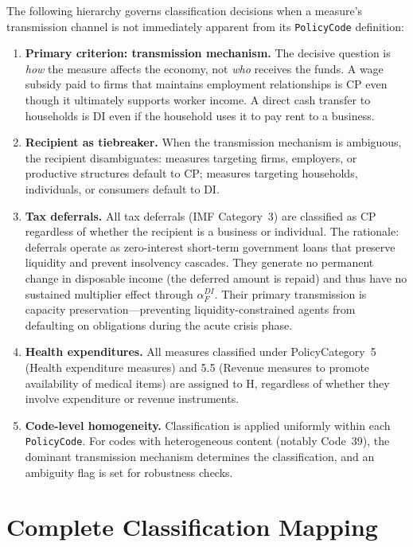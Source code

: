 \documentclass[12pt,a4paper]{article}
\begin{document}
The following hierarchy governs classification decisions when a measure's transmission
channel is not immediately apparent from its \texttt{PolicyCode} definition:

\begin{enumerate}[leftmargin=2em]
  \item \textbf{Primary criterion: transmission mechanism.} The decisive question
    is \emph{how} the measure affects the economy, not \emph{who} receives the funds.
    A wage subsidy paid to firms that maintains employment relationships is CP even
    though it ultimately supports worker income. A direct cash transfer to households
    is DI even if the household uses it to pay rent to a business.
  \item \textbf{Recipient as tiebreaker.} When the transmission mechanism is ambiguous,
    the recipient disambiguates: measures targeting firms, employers, or productive
    structures default to CP; measures targeting households, individuals, or consumers
    default to DI.
  \item \textbf{Tax deferrals.} All tax deferrals (IMF Category~3) are classified as
    CP regardless of whether the recipient is a business or individual. The
    rationale: deferrals operate as zero-interest short-term government loans that
    preserve liquidity and prevent insolvency cascades. They generate no permanent
    change in disposable income (the deferred amount is repaid) and thus have no
    sustained multiplier effect through $\alpha_F^{DI}$. Their primary transmission
    is capacity preservation---preventing liquidity-constrained agents from defaulting
    on obligations during the acute crisis phase.
  \item \textbf{Health expenditures.} All measures classified under PolicyCategory~5
    (Health expenditure measures) and 5.5 (Revenue measures to promote availability
    of medical items) are assigned to H, regardless of whether they involve
    expenditure or revenue instruments.
  \item \textbf{Code-level homogeneity.} Classification is applied uniformly within
    each \texttt{PolicyCode}. For codes with heterogeneous content (notably Code~39),
    the dominant transmission mechanism determines the classification, and an
    ambiguity flag is set for robustness checks.
\end{enumerate}


\section{Complete Classification Mapping}
\end{document}
